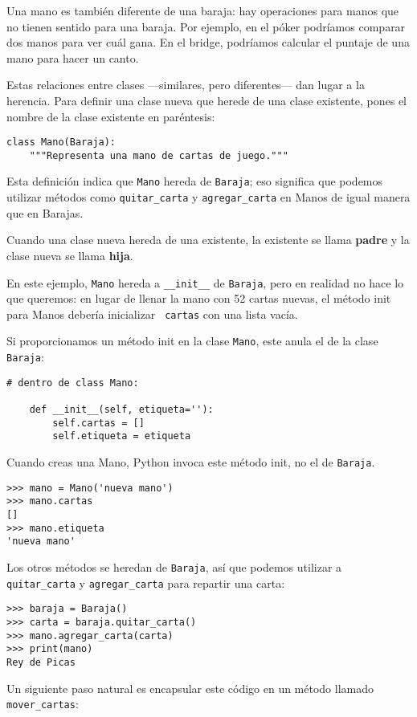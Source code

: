 \documentclass[10pt]{book}
\begin{document}
Una mano es también diferente de una baraja: hay operaciones para
manos que no tienen sentido para una baraja.  Por ejemplo, en el póker
podríamos comparar dos manos para ver cuál gana.  En el bridge, podríamos
calcular el puntaje de una mano para hacer un canto.

Estas relaciones entre clases ---similares, pero diferentes--- dan lugar
a la herencia.
Para definir una clase nueva que herede de una clase existente,
pones el nombre de la clase existente en paréntesis:

\begin{verbatim}
class Mano(Baraja):
    """Representa una mano de cartas de juego."""
\end{verbatim}
%
Esta definición indica que {\tt Mano} hereda de {\tt Baraja};
eso significa que podemos utilizar métodos como \verb"quitar_carta" y \verb"agregar_carta"
en Manos de igual manera que en Barajas.

Cuando una clase nueva hereda de una existente, la existente
se llama {\bf padre} y la clase nueva se
llama {\bf hija}.

En este ejemplo, {\tt Mano} hereda a \verb"__init__" de {\tt Baraja},
pero en realidad no hace lo que queremos: en lugar de llenar la mano
con 52 cartas nuevas, el método init para Manos debería inicializar {\tt
  cartas} con una lista vacía.   

Si proporcionamos un método init en la clase {\tt Mano}, este anula el
de la clase {\tt Baraja}:

\begin{verbatim}
# dentro de class Mano:

    def __init__(self, etiqueta=''):
        self.cartas = []
        self.etiqueta = etiqueta
\end{verbatim}
%
Cuando creas una Mano, Python invoca este método init, no el
de {\tt Baraja}.

\begin{verbatim}
>>> mano = Mano('nueva mano')
>>> mano.cartas
[]
>>> mano.etiqueta
'nueva mano'
\end{verbatim}
%
Los otros métodos se heredan de {\tt Baraja}, así que podemos utilizar a
\verb"quitar_carta" y \verb"agregar_carta" para repartir una carta:

\begin{verbatim}
>>> baraja = Baraja()
>>> carta = baraja.quitar_carta()
>>> mano.agregar_carta(carta)
>>> print(mano)
Rey de Picas
\end{verbatim}
%
Un siguiente paso natural es encapsular este código en un método
llamado \verb"mover_cartas":
\end{document}
